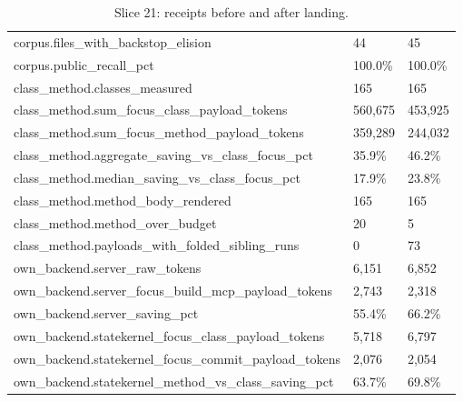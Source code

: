 \documentclass{article}
\begin{document}
\begin{table}[h]
\begin{tabular}{lll}
corpus.files\_with\_backstop\_elision & 44 & 45 \\
corpus.public\_recall\_pct & 100.0\% & 100.0\% \\
class\_method.classes\_measured & 165 & 165 \\
class\_method.sum\_focus\_class\_payload\_tokens & 560,675 & 453,925 \\
class\_method.sum\_focus\_method\_payload\_tokens & 359,289 & 244,032 \\
class\_method.aggregate\_saving\_vs\_class\_focus\_pct & 35.9\% & 46.2\% \\
class\_method.median\_saving\_vs\_class\_focus\_pct & 17.9\% & 23.8\% \\
class\_method.method\_body\_rendered & 165 & 165 \\
class\_method.method\_over\_budget & 20 & 5 \\
class\_method.payloads\_with\_folded\_sibling\_runs & 0 & 73 \\
own\_backend.server\_raw\_tokens & 6,151 & 6,852 \\
own\_backend.server\_focus\_build\_mcp\_payload\_tokens & 2,743 & 2,318 \\
own\_backend.server\_saving\_pct & 55.4\% & 66.2\% \\
own\_backend.statekernel\_focus\_class\_payload\_tokens & 5,718 & 6,797 \\
own\_backend.statekernel\_focus\_commit\_payload\_tokens & 2,076 & 2,054 \\
own\_backend.statekernel\_method\_vs\_class\_saving\_pct & 63.7\% & 69.8\% \\
\bottomrule
\end{tabular}
\caption{Slice 21: receipts before and after landing.}
\label{tab:slice21}
\end{table}
\end{document}
